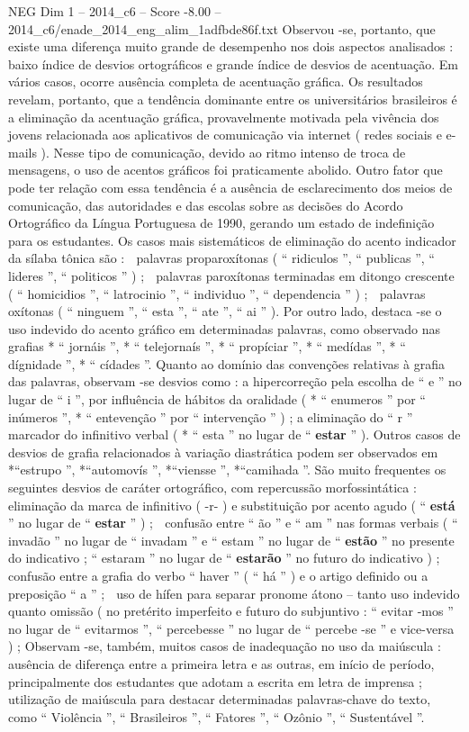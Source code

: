 \begin{textsample}{NEG Dim 1 – 2014\_c6 – Score -8.00 – 2014\_c6/enade\_2014\_eng\_alim\_1adfbde86f.txt}
Observou -se, portanto, que existe uma diferença muito grande de desempenho nos dois aspectos analisados : baixo índice de desvios ortográficos e grande índice de desvios de acentuação.
Em vários casos, ocorre ausência completa de acentuação gráfica.
Os resultados revelam, portanto, que a tendência dominante entre os universitários brasileiros é a eliminação da acentuação gráfica, provavelmente motivada pela vivência dos jovens relacionada aos aplicativos de comunicação via internet ( redes sociais e e-mails ).
Nesse tipo de comunicação, devido ao ritmo intenso de troca de mensagens, o uso de acentos gráficos foi praticamente abolido.
Outro fator que pode ter relação com essa tendência é a ausência de esclarecimento dos meios de comunicação, das autoridades e das escolas sobre as decisões do Acordo Ortográfico da Língua Portuguesa de 1990, gerando um estado de indefinição para os estudantes.
Os casos mais sistemáticos de eliminação do acento indicador da sílaba tônica são :  palavras proparoxítonas ( “ ridiculos ”, “ publicas ”, “ lideres ”, “ politicos ” ) ;  palavras paroxítonas terminadas em ditongo crescente ( “ homicidios ”, “ latrocinio ”, “ individuo ”, “ dependencia ” ) ;  palavras oxítonas ( “ ninguem ”, “ esta ”, “ ate ”, “ ai ” ).
Por outro lado, destaca -se o uso indevido do acento gráfico em determinadas palavras, como observado nas grafias * “ jornáis ”, * “ telejornaís ”, * “ propíciar ”, * “ medídas ”, * “ dígnidade ”, * “ cídades ”.
Quanto ao domínio das convenções relativas à grafia das palavras, observam -se desvios como : a hipercorreção pela escolha de “ e ” no lugar de “ i ”, por influência de hábitos da oralidade ( * “ enumeros ” por “ inúmeros ”, * “ entevenção ” por “ intervenção ” ) ; a eliminação do “ r ” marcador do infinitivo verbal ( * “ esta ” no lugar de “ \textbf{estar} ” ).
Outros casos de desvios de grafia relacionados à variação diastrática podem ser observados em *“estrupo ”, *“automovís ”, *“viensse ”, *“camihada ”.
São muito frequentes os seguintes desvios de caráter ortográfico, com repercussão morfossintática :  eliminação da marca de infinitivo ( -r- ) e substituição por acento agudo ( “ \textbf{está} ” no lugar de “ \textbf{estar} ” ) ;  confusão entre “ ão ” e “ am ” nas formas verbais ( “ invadão ” no lugar de “ invadam ” e “ estam ” no lugar de “ \textbf{estão} ” no presente do indicativo ; “ estaram ” no lugar de “ \textbf{estarão} ” no futuro do indicativo ) ;  confusão entre a grafia do verbo “ haver ” ( “ há ” ) e o artigo definido ou a preposição “ a ” ;  uso de hífen para separar pronome átono – tanto uso indevido quanto omissão ( no pretérito imperfeito e futuro do subjuntivo : “ evitar -mos ” no lugar de “ evitarmos ”, “ percebesse ” no lugar de “ percebe -se ” e vice-versa ) ; Observam -se, também, muitos casos de inadequação no uso da maiúscula : ausência de diferença entre a primeira letra e as outras, em início de período, principalmente dos estudantes que adotam a escrita em letra de imprensa ; utilização de maiúscula para destacar determinadas palavras-chave do texto, como “ Violência ”, “ Brasileiros ”, “ Fatores ”, “ Ozônio ”, “ Sustentável ”.

\end{textsample}
